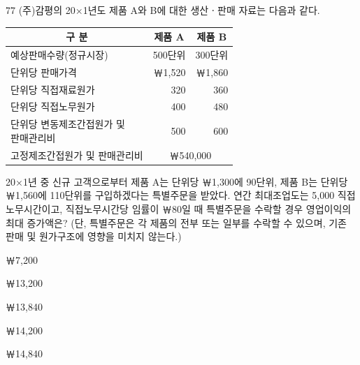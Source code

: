 \begin{question}{77}
(주)감평의 20×1년도 제품 A와 B에 대한 생산ㆍ판매 자료는 다음과 같다.
\par
{\small\centering
\begin{tabular}{|l|r|r|}\hline
\multicolumn{1}{|c|}{구 분} & \multicolumn{1}{c|}{제품 A} & \multicolumn{1}{c|}{제품 B} \\\hline
예상판매수량(정규시장) & 500단위 & 300단위 \\\hline
단위당 판매가격 & ￦1,520 & ￦1,860 \\\hline
단위당 직접재료원가 & 320 & 360 \\\hline
단위당 직접노무원가 & 400 & 480 \\\hline
\makecell[l]{단위당 변동제조간접원가 및\\판매관리비} & 500 & 600 \\\hline
고정제조간접원가 및 판매관리비 & \multicolumn{2}{c|}{￦540,000} \\\hline
\end{tabular}\par}
20×1년 중 신규 고객으로부터 제품 A는 단위당 ￦1,300에 90단위, 제품 B는 단위당 ￦1,560에 110단위를 구입하겠다는 특별주문을 받았다. 연간 최대조업도는 5,000 직접노무시간이고, 직접노무시간당 임률이 ￦80일 때 특별주문을 수락할 경우 영업이익의 최대 증가액은? (단, 특별주문은 각 제품의 전부 또는 일부를 수락할 수 있으며, 기존 판매 및 원가구조에 영향을 미치지 않는다.) \par
\begin{choices}
  \item ￦7,200
  \item ￦13,200
  \item ￦13,840
  \item ￦14,200
  \item ￦14,840
\end{choices}
\end{question}

